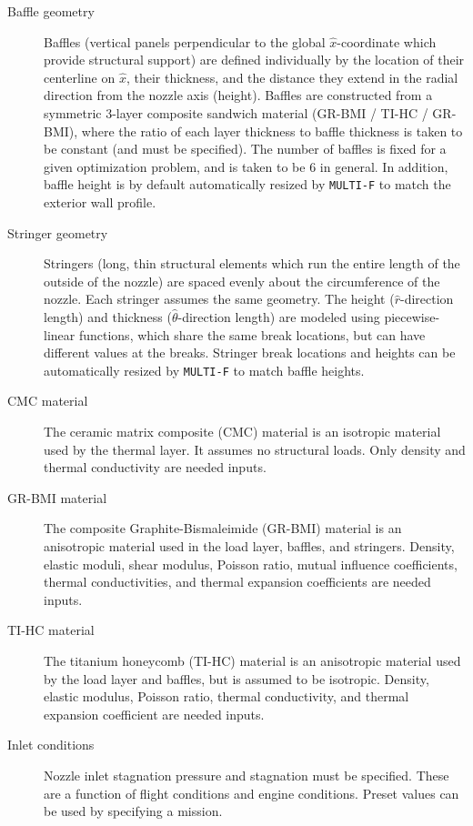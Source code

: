 \documentclass{article}
\begin{document}
\begin{description}
\item[Baffle geometry] Baffles (vertical panels perpendicular to the global $\hat{x}$-coordinate which provide structural support) are defined individually by the location of their centerline on $\hat{x}$, their thickness, and the distance they extend in the radial direction from the nozzle axis (height). Baffles are constructed from a symmetric 3-layer composite sandwich material (GR-BMI / TI-HC / GR-BMI), where the ratio of each layer thickness to baffle thickness is taken to be constant (and must be specified). The number of baffles is fixed for a given optimization problem, and is taken to be 6 in general. In addition, baffle height is by default automatically resized by \texttt{MULTI-F} to match the exterior wall profile.

\item[Stringer geometry] Stringers (long, thin structural elements which run the entire length of the outside of the nozzle) are spaced evenly about the circumference of the nozzle. Each stringer assumes the same geometry. The height ($\hat{r}$-direction length) and thickness ($\hat{\theta}$-direction length) are modeled using piecewise-linear functions, which share the same break locations, but can have different values at the breaks. Stringer break locations and heights can be automatically resized by \texttt{MULTI-F} to match baffle heights.

\item[CMC material] The ceramic matrix composite (CMC) material is an isotropic material used by the thermal layer. It assumes no structural loads. Only density and thermal conductivity are needed inputs.

\item[GR-BMI material] The composite Graphite-Bismaleimide (GR-BMI) material is an anisotropic material used in the load layer, baffles, and stringers. Density, elastic moduli, shear modulus, Poisson ratio, mutual influence coefficients, thermal conductivities, and thermal expansion coefficients are needed inputs.

\item[TI-HC material] The titanium honeycomb (TI-HC) material is an anisotropic material used by the load layer and baffles, but is assumed to be isotropic. Density, elastic modulus, Poisson ratio, thermal conductivity, and thermal expansion coefficient are needed inputs.

\item[Inlet conditions] Nozzle inlet stagnation pressure and stagnation must be specified. These are a function of flight conditions and engine conditions. Preset values can be used by specifying a mission.


\end{description}
\end{document}
